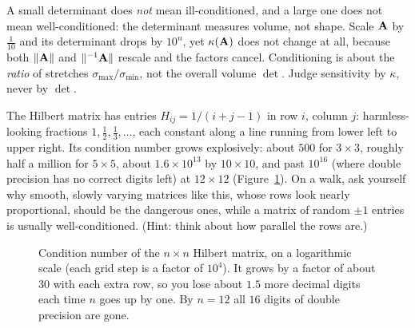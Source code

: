 \begin{trapbox}
A small determinant does \emph{not} mean ill-conditioned, and a large one does not
mean well-conditioned: the determinant measures volume, not shape. Scale $\mathbf{A}$ by
$\tfrac{1}{10}$ and its determinant drops by $10^{n}$, yet $\kappa(\mathbf{A})$ does not
change at all, because both $\lVert\mathbf{A}\rVert$ and $\lVert^{-1}{\mathbf{A}}\rVert$ rescale and the
factors cancel. Conditioning is about the \emph{ratio} of stretches
$\sigma_{\max}/\sigma_{\min}$, not the overall volume $\det$. Judge sensitivity by
$\kappa$, never by $\det$.
\end{trapbox}

\begin{walkbox}
The Hilbert matrix has entries $H_{ij}=1/(i+j-1)$ in row $i$, column $j$: harmless-looking
fractions $1, \tfrac12, \tfrac13,\ldots$, each constant along a line running from lower
left to upper right. Its condition number grows explosively: about $500$ for
$3\times 3$, roughly half a million for $5\times 5$, about $1.6\times 10^{13}$ by
$10\times 10$, and past $10^{16}$ (where double precision has no correct digits left)
at $12\times 12$ (Figure~\ref{ch33:hilbert}). On a walk, ask yourself why smooth, slowly
varying matrices like this, whose rows look nearly proportional, should be the dangerous
ones, while a matrix of random $\pm 1$ entries is usually well-conditioned. (Hint: think
about how parallel the rows are.)
\end{walkbox}

\begin{figure}[htbp]
\centering
{}
\caption{Condition number of the $n\times n$ Hilbert matrix, on a logarithmic scale (each
grid step is a factor of $10^4$). It grows by a factor of about $30$ with each extra row,
so you lose about $1.5$ more decimal digits each time $n$ goes up by one. By $n=12$ all
$16$ digits of double precision are gone.}
\label{ch33:hilbert}
\end{figure}


